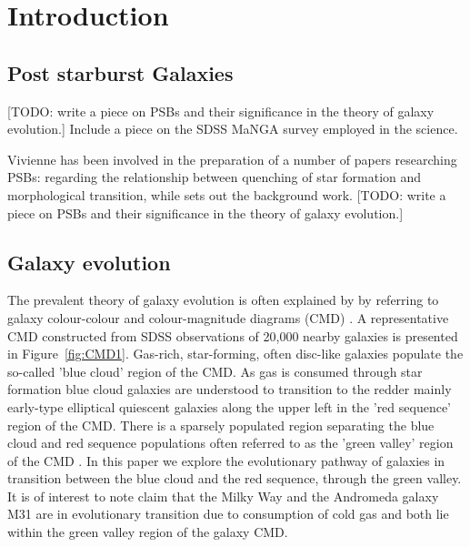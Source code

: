\section{Introduction}
\label{sec:introduction}

% 

\subsection{Post starburst Galaxies}
[TODO: write a piece on PSBs and their significance in the theory of galaxy evolution.] Include a piece on the SDSS MaNGA survey employed in the science.

Vivienne has been involved in the preparation of a number of papers researching PSBs: \citet{2017MNRAS.472.1401A} regarding the relationship between quenching of star formation and morphological transition, while \citet{2016MNRAS.463..832W} sets out the background work.
[TODO: write a piece on PSBs and their significance in the theory of galaxy evolution.]

\subsection{Galaxy evolution}
\label{sec:evolution}

The prevalent theory of galaxy evolution is often explained  by  by referring to galaxy colour-colour and colour-magnitude diagrams (CMD) \citep[see e.g.][]{2001AJ....122.1861S, 2003ApJ...585L...5H, 2003ApJS..149..289B,baldry2004quantifying,2006MNRAS.373..469B}. A representative CMD constructed from SDSS observations of 20,000 nearby galaxies is presented in  Figure~\ref{fig:CMD1}. Gas-rich, star-forming, often disc-like galaxies populate the so-called 'blue cloud' region of the CMD. As gas is consumed through star formation blue cloud galaxies are understood to transition to the redder mainly early-type elliptical quiescent galaxies along the upper left in the 'red sequence' region of the CMD. There is a sparsely populated region separating the blue cloud and red sequence populations often referred to as the 'green valley' region of the CMD  \citep{2004ApJ...608..752B}. In this paper we explore the evolutionary pathway of galaxies in transition between the blue cloud and the red sequence, through the green valley.
It is of interest to note \citet{Mutch_2011} claim that the Milky Way and the Andromeda galaxy M31 are in evolutionary transition due to consumption of cold gas and both lie within the green valley region of the galaxy CMD.


